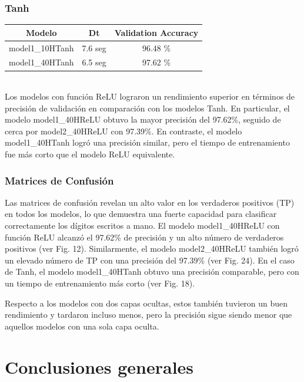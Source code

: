 \documentclass[journal]{IEEEtai}
\begin{document}
\subsubsection{Tanh}

\hfill \break

\begin{tabular}{| c | c | c |}
\hline
Modelo & Dt & Validation Accuracy \\
\hline
model1\_10HTanh& 7.6 seg & 96.48 \% \\
model1\_40HTanh & 6.5 seg & 97.62 \% \\
\hline
\end{tabular} \\

Los modelos con función ReLU lograron un rendimiento superior en términos de precisión de validación en comparación con los modelos Tanh. En particular, el modelo model1\_40HReLU obtuvo la mayor precisión del 97.62\%, seguido de cerca por model2\_40HReLU con 97.39\%. En contraste, el modelo model1\_40HTanh logró una precisión similar, pero el tiempo de entrenamiento fue más corto que el modelo ReLU equivalente.

\subsubsection{Matrices de Confusión}

Las matrices de confusión revelan un alto valor en los verdaderos positivos (TP) en todos los modelos, lo que demuestra una fuerte capacidad para clasificar correctamente los dígitos escritos a mano. El modelo model1\_40HReLU con función ReLU alcanzó el 97.62\% de precisión y un alto número de verdaderos positivos (ver Fig. 12). Similarmente, el modelo model2\_40HReLU también logró un elevado número de TP con una precisión del 97.39\% (ver Fig. 24). En el caso de Tanh, el modelo model1\_40HTanh obtuvo una precisión comparable, pero con un tiempo de entrenamiento más corto (ver Fig. 18).

Respecto a los modelos con dos capas ocultas, estos también tuvieron un buen rendimiento y tardaron incluso menos, pero la precisión sigue siendo menor que aquellos modelos con una sola capa oculta.

\section{Conclusiones generales}
\end{document}
